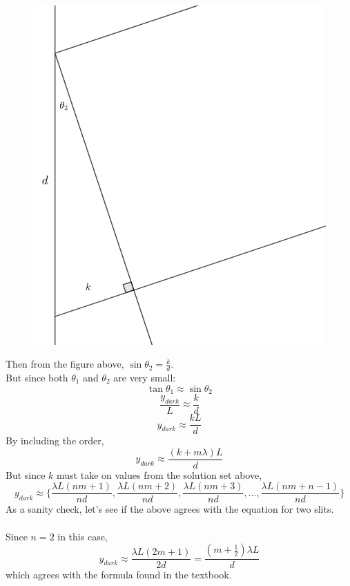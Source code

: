 \documentclass[12pt]{article}
\begin{document}
\begin{figure}[h!]
  \centering
  \includegraphics[scale=0.54]{simtriangle.png}

\end{figure}

Then from the figure above, $\sin \theta_2 = \frac{k}{d}$. \\But since both $\theta_1$ and $\theta_2$ are very small:
$$\tan \theta_1 \approx \sin \theta_2$$
$$\frac{y_{dark}}{L} \approx \frac{k}{d}$$
$$y_{dark} \approx \frac{kL}{d}$$
By including the order,
$$y_{dark} \approx \frac{(k+m\lambda)L}{d}$$
\newpage
But since $k$ must take on values from the solution set above, 
$$y_{dark} \approx \bigg\{\frac{\lambda L(nm+1)}{nd}, \frac{\lambda L(nm+2)}{nd},\frac{\lambda L(nm+3)}{nd}, \ldots, \frac{\lambda L(nm+n-1)}{nd}\bigg\}$$
As a sanity check, let's see if the above agrees with the equation for two slits.
\\
\\Since $n = 2$ in this case, 
$$y_{dark} \approx \frac{\lambda L(2m+1)}{2d} = \frac{(m+\frac{1}{2})\lambda L}{d}$$
which agrees with the formula found in the textbook.
\newpage
\end{document}
